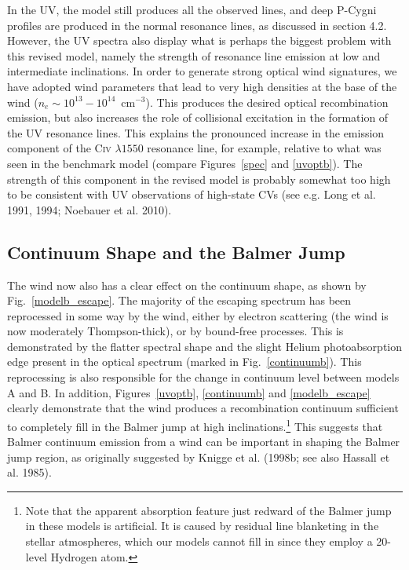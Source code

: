 \documentclass[preprint, a4paper, 11pt]{aastex}
\begin{document}
In the UV, the model still produces all the observed lines, 
and deep P-Cygni profiles are produced in the normal resonance lines,
as discussed in section 4.2. However, the UV spectra also
display what is perhaps the biggest problem with this revised model,
namely the strength of resonance line emission 
at low and intermediate inclinations.
In order to generate strong optical wind signatures, we have adopted wind
parameters that lead to very high densities at the base of the wind
($n_e\sim10^{13}-10^{14}$~cm$^{-3}$). This produces
the desired optical recombination emission, but also increases the
role of collisional excitation in the formation of the UV resonance
lines. This explains the pronounced increase in the emission component 
of the C\textsc{iv} $\lambda1550$ resonance line, for example, relative to
what was seen in the benchmark model (compare Figures~\ref{spec} and
\ref{uvoptb}). The strength of this component in the revised model 
is probably somewhat too high to be consistent with UV observations 
of high-state CVs (see e.g. Long et al. 1991, 1994; Noebauer et al. 2010).
\nocite{long1991,long1994, noebauer}

\subsection{Continuum Shape and the Balmer Jump}

The wind now also has a clear effect on the continuum shape,
as shown by Fig.~\ref{modelb_escape}. The majority of the
escaping spectrum has been reprocessed in some way by the wind,
either by electron scattering (the wind is now moderately Thompson-thick),
or by bound-free processes. This is demonstrated by the flatter spectral shape
and the slight Helium photoabsorption edge present in the optical spectrum 
(marked in Fig.~\ref{continuumb}). This reprocessing is also
responsible for the change in continuum level between models A and B.
In addition, Figures~\ref{uvoptb}, \ref{continuumb} 
and \ref{modelb_escape} clearly demonstrate that the wind produces
a recombination continuum sufficient to completely fill in the Balmer jump
at high inclinations.\footnote{Note that the apparent absorption feature 
just redward of the Balmer jump in these models is artificial. It is
caused by residual line blanketing in the stellar atmospheres, which
our models cannot fill in since they employ a 20-level Hydrogen atom.}
This suggests that Balmer continuum emission from a wind can be important 
in shaping the Balmer jump region, as
originally suggested by Knigge et al.
(1998b; see also Hassall et al. 1985)\nocite{KLWB98,hassall}. 
\end{document}
